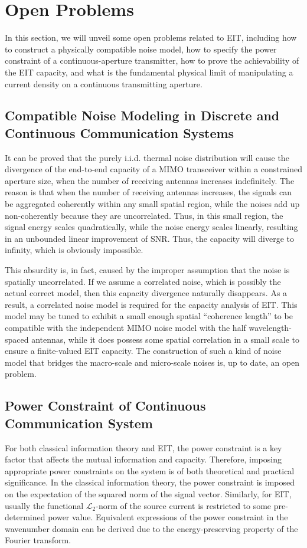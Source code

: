 \documentclass[journal,twocolumn]{IEEEtran}
\begin{document}
\section{Open Problems}
In this section, we will unveil some open problems related to EIT, including how to construct a physically compatible noise model, how to specify the power constraint of a continuous-aperture transmitter, how to prove the achievability of the EIT capacity, and what is the fundamental physical limit of manipulating a current density on a continuous transmitting aperture. 

\subsection{Compatible Noise Modeling in Discrete and Continuous Communication Systems}
It can be proved that the purely i.i.d. thermal noise distribution will cause the divergence of the end-to-end capacity of a MIMO transceiver within a constrained aperture size, when the number of receiving antennas increases indefinitely. 
The reason is that when the number of receiving antennas increases, the signals can be aggregated coherently within any small spatial region, while the noises add up non-coherently because they are uncorrelated. 
Thus, in this small region, the signal energy scales quadratically, while the noise energy scales linearly, resulting in an unbounded linear improvement of SNR. Thus, the capacity will diverge to infinity, which is obviously impossible.  

This absurdity is, in fact, caused by the improper assumption that the noise is spatially uncorrelated. 
If we assume a correlated noise, which is possibly the actual correct model, then this capacity divergence naturally disappears. 
As a result, a correlated noise model is required for the capacity analysis of EIT. This model may be tuned to exhibit a small enough spatial ``coherence length'' to be compatible with the independent MIMO noise model with the half wavelength-spaced antennas, while it does possess some spatial correlation in a small scale to ensure a finite-valued EIT capacity. 
The construction of such a kind of noise model that bridges the macro-scale and micro-scale noises is, up to date, an open problem. 

\subsection{Power Constraint of Continuous Communication System}
For both classical information theory and EIT, the power constraint is a key factor that affects the mutual information and capacity. 
Therefore, imposing appropriate power constraints on the system is of both theoretical and practical significance. 
In the classical information theory, the power constraint is imposed on the expectation of the squared norm of the signal vector.  
Similarly, for EIT, usually the functional $\mathcal{L}_2$-norm of the source current is restricted to some pre-determined power value. 
Equivalent expressions of the power constraint in the wavenumber domain can be derived due to the energy-preserving property of the Fourier transform. 
\end{document}
